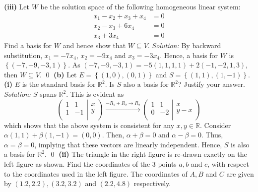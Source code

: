 \documentclass{article}
\begin{document}
\newline
\newline\textbf{(iii)} Let $W$ be the solution space of the following homogeneous linear system:
\begin{align*}
    x_1-x_2+x_3+x_4&=0\\
    x_2-x_3+6x_4&=0\\
    x_3+3x_4&=0
\end{align*}
Find a basis for $W$ and hence show that $W \subseteq V$.
\newline
\newline\textit{Solution:} By backward substitution, $x_1=-7x_4$, $x_2=-9x_4$ and $x_3=-3x_4$. Hence, a basis for $W$ is $\left\{(-7,-9,-3,1)\right\}$. As $(-7,-9,-3,1)=-5(1,1,1,1)+2(-1,-2,1,3)$, then $W\subseteq V$. \qed 
\newline\newline\textbf{(b)} Let $E=\left\{(1,0),(0,1)\right\}$ and $S=\left\{(1,1),(1,-1)\right\}$.
\newline\textbf{(i)} $E$ is the standard basis for $\mathbb{R}^2$. Is $S$ also a basis for $\mathbb{R}^2$? Justify your answer.
\newline
\newline\textit{Solution:} $S$ spans $\mathbb{R}^2$. This is evident as \[\left( \left. \begin{matrix}
   1 & 1  \\
   1 & -1  \\
\end{matrix} \right|\begin{matrix}
   x  \\
   y  \\
\end{matrix} \right)\xrightarrow{-{{R}_{1}}+{{R}_{2}}\to {{R}_{2}}}\left( \left. \begin{matrix}
   1 & 1  \\
   0 & -2  \\
\end{matrix} \right|\begin{matrix}
   x  \\
   y-x  \\
\end{matrix} \right)\] which shows that the above system is consistent for any $x,y\in\mathbb{R}$. Consider $\alpha(1,1)+\beta(1,-1)=(0,0)$. Then, $\alpha+\beta=0$ and $\alpha-\beta=0$. Thus, $\alpha=\beta=0$, implying that these vectors are linearly independent. Hence, $S$ is also a basis for $\mathbb{R}^2$. \qed 
\newpage
\textbf{(ii)} The triangle in the right figure is re-drawn exactly on the left figure as shown. Find the coordinates of the 3 points $a,b$ and $c$, with respect to the coordinates used in the left figure. The coordinates of $A,B$ and $C$ are given by $(1.2,2.2), (3.2,3.2)$ and $(2.2,4.8)$ respectively.
\end{document}
